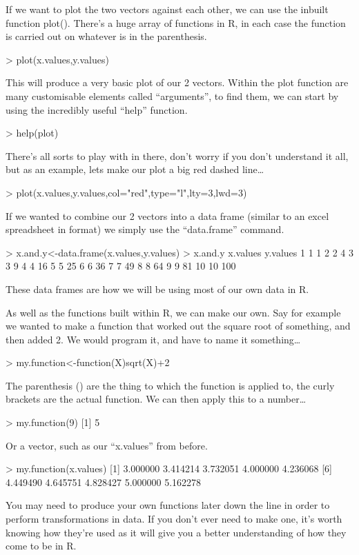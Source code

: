 \documentclass{article}
\begin{document}
If we want to plot the two vectors against each other, we can use the inbuilt function plot().  There’s a huge array of functions in R, in each case the function is carried out on whatever is in the parenthesis. 

> plot(x.values,y.values)

This will produce a very basic plot of our 2 vectors. Within the plot function are many customisable elements called “arguments”, to find them, we can start by using the incredibly useful “help” function. 

> help(plot)

There’s all sorts to play with in there, don’t worry if you don’t understand it all, but as an example, lets make our plot a big red dashed line…

> plot(x.values,y.values,col="red",type="l",lty=3,lwd=3)

If we wanted to combine our 2 vectors into a data frame (similar to an excel spreadsheet in format) we simply use the “data.frame” command.

> x.and.y<-data.frame(x.values,y.values)
> x.and.y
     x.values y.values
1         1        1
2         2        4
3         3        9
4         4       16
5         5       25
6         6       36
7         7       49
8         8       64
9         9       81
10       10      100

These data frames are how we will be using most of our own data in R. 

As well as the functions built within R, we can make our own. Say for example we wanted to make a function that worked out the square root of something, and then added 2. We would program it, and have to name it something…

> my.function<-function(X){sqrt(X)+2}

The parenthesis () are the thing to which the function is applied to, the curly brackets {} are the actual function. We can then apply this to a number…

> my.function(9)
[1] 5

Or a vector, such as our “x.values” from before.

> my.function(x.values)
 [1] 3.000000 3.414214 3.732051 4.000000 4.236068 
 [6] 4.449490 4.645751 4.828427 5.000000 5.162278

You may need to produce your own functions later down the line in order to perform transformations in data. If you don’t ever need to make one, it’s worth knowing how they’re used as it will give you a better understanding of how they come to be in R. 
\end{document}
